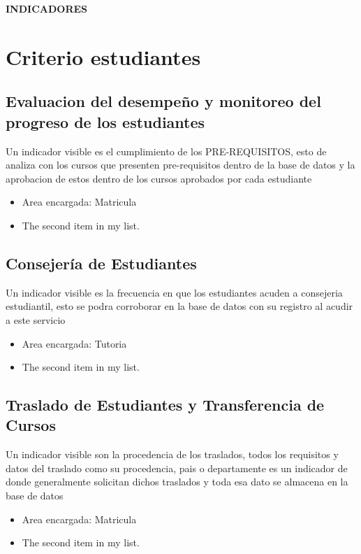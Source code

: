 \documentclass[12pt,a4paper]{report}
\begin{document}


\tableofcontents
\newpage

\begin{Large}
\textbf{INDICADORES} 
\end{Large}
\section{Criterio estudiantes}

\subsection{Evaluacion del desempeño y monitoreo del progreso de los estudiantes}
Un indicador visible es el cumplimiento de los PRE-REQUISITOS, esto de analiza con los cursos que presenten pre-requisitos dentro de la base de datos y la aprobacion de estos dentro de los cursos aprobados por cada estudiante
\begin{itemize}
\item Area encargada: Matricula
\item The second item in my list.
\end{itemize}
\subsection{Consejería de Estudiantes}
Un indicador visible es la frecuencia en que los estudiantes acuden a consejeria estudiantil, esto se podra corroborar en la base de datos con su registro al acudir a este servicio
\begin{itemize}
\item Area encargada: Tutoria
\item The second item in my list.
\end{itemize}
\subsection{Traslado de Estudiantes y Transferencia de Cursos}
Un indicador visible son la procedencia de los traslados, todos los requisitos y datos del traslado como su procedencia, pais o departamente es un indicador de donde generalmente solicitan dichos traslados y toda esa dato se almacena en la base de datos
\begin{itemize}
\item Area encargada: Matricula
\item The second item in my list.
\end{itemize}
\end{document}
